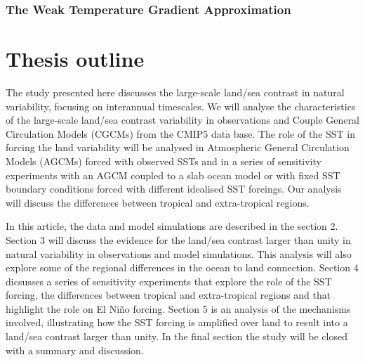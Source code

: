 \subsubsection{The Weak Temperature Gradient Approximation}\label{sssec:wtg}


\section{Thesis outline}

The study presented here discusses the large-scale land/sea contrast in natural 
variability, focusing on interannual timescales. We will analyse the 
characteristics of the large-scale land/sea contrast variability in observations 
and Couple General Circulation Models (CGCMs) from the CMIP5 data base. The role 
of the SST in forcing the land variability will be analysed in Atmospheric 
General Circulation Models (AGCMs) forced with observed SSTs and in a series of 
sensitivity experiments with an AGCM coupled to a slab ocean model or with fixed 
SST boundary conditions forced with different idealised SST forcings.  Our 
analysis will discuss the differences between tropical and extra-tropical 
regions.

In this article, the data and model simulations are described in the section 
2. Section 3 will discuss the evidence for the land/sea contrast larger than
unity in natural variability in observations and model simulations. This 
analysis will also explore some of the regional differences in the ocean to land 
connection. Section 4 dicsusses a series of sensitivity experiments that explore 
the role of the SST forcing, the differences between tropical and extra-tropical 
regions and that highlight the role on El Ni{\~n}o forcing.  Section 5 is an 
analysis of the mechanisms involved, illustrating how the SST forcing is 
amplified over land to result into a land/sea contrast larger than unity. In the 
final section the study will be closed with a summary and discussion.


